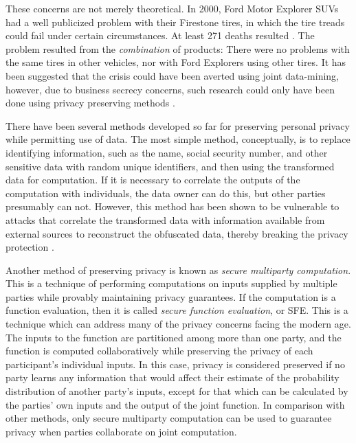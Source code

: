 These concerns are not merely theoretical. In 2000, Ford Motor Explorer
SUVs had a well publicized problem with their Firestone tires, in
which the tire treads could fail under certain circumstances. At least
271 deaths resulted \cite{NYTFordFirestone}. The problem resulted
from the \emph{combination} of products: There were no problems with
the same tires in other vehicles, nor with Ford Explorers using other
tires. It has been suggested that the crisis could have been averted
using joint data-mining, however, due to business secrecy concerns,
such research could only have been done using privacy preserving methods
\cite{VaidyaClifton:2002}.

There have been several methods developed so far for preserving personal
privacy while permitting use of data. The most simple method, conceptually,
is to replace identifying information, such as the name, social security
number, and other sensitive data with random unique identifiers, and
then using the transformed data for computation. If it is necessary
to correlate the outputs of the computation with individuals, the
data owner can do this, but other parties presumably can not. However,
this method has been shown to be vulnerable to attacks that correlate
the transformed data with information available from external sources
to reconstruct the obfuscated data, thereby breaking the privacy protection
\cite{Malin04}. 

Another method of preserving privacy is known as \emph{secure multiparty
computation}. This is a technique of performing computations on inputs
supplied by multiple parties while provably maintaining privacy guarantees.
If the computation is a function evaluation, then it is called \emph{secure
function evaluation}, or SFE. This is a technique which can address
many of the privacy concerns facing the modern age. The inputs to
the function are partitioned among more than one party, and the function
is computed collaboratively while preserving the privacy of each participant's
individual inputs. In this case, privacy is considered preserved if
no party learns any information that would affect their estimate of
the probability distribution of another party's inputs, except for
that which can be calculated by the parties' own inputs and the output
of the joint function. In comparison with other methods, only secure
multiparty computation can be used to guarantee privacy when parties
collaborate on joint computation. %
\begin{comment}
%
\begin{lyxgreyedout}
Needs clarification
\end{lyxgreyedout}
 In other words, the entropy gain of each party is equivalent to the
entropy gain in an idealized protocol where a trusted third party
collects all the inputs, evaluates the function, and transmits only
the output to each party. Depending on the protocol, the guarantees
for some parties may be based on typical assumptions of computational
hardness, while the guarantees for other parties may be information
theoretic.
\end{comment}
{}

